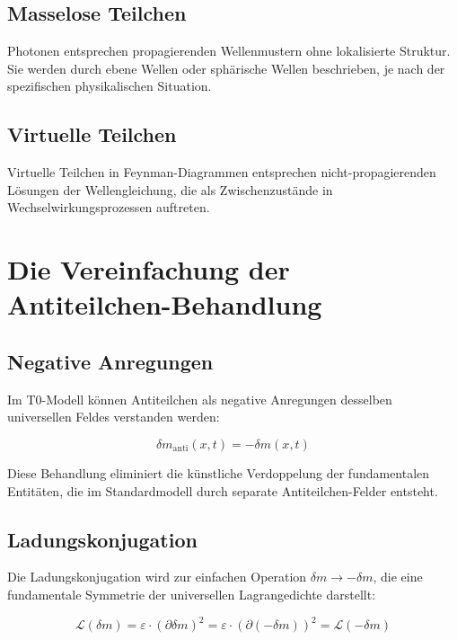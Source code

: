 \documentclass[12pt,a4paper]{report}
\begin{document}
	\subsection{Masselose Teilchen}
	
	Photonen entsprechen propagierenden Wellenmustern ohne lokalisierte Struktur. Sie werden durch ebene Wellen oder sphärische Wellen beschrieben, je nach der spezifischen physikalischen Situation.
	
	\subsection{Virtuelle Teilchen}
	
	Virtuelle Teilchen in Feynman-Diagrammen entsprechen nicht-propagierenden Lösungen der Wellengleichung, die als Zwischenzustände in Wechselwirkungsprozessen auftreten.
	
	\section{Die Vereinfachung der Antiteilchen-Behandlung}
	
	\subsection{Negative Anregungen}
	
	Im T0-Modell können Antiteilchen als negative Anregungen desselben universellen Feldes verstanden werden:
	
	\begin{equation}
		\delta m_{\text{anti}}(x,t) = -\delta m(x,t)
	\end{equation}
	
	Diese Behandlung eliminiert die künstliche Verdoppelung der fundamentalen Entitäten, die im Standardmodell durch separate Antiteilchen-Felder entsteht.
	
	\subsection{Ladungskonjugation}
	
	Die Ladungskonjugation wird zur einfachen Operation $\delta m \to -\delta m$, die eine fundamentale Symmetrie der universellen Lagrangedichte darstellt:
	
	\begin{equation}
		\mathcal{L}(\delta m) = \varepsilon \cdot (\partial\delta m)^2 = \varepsilon \cdot (\partial(-\delta m))^2 = \mathcal{L}(-\delta m)
	\end{equation}
	
\end{document}
